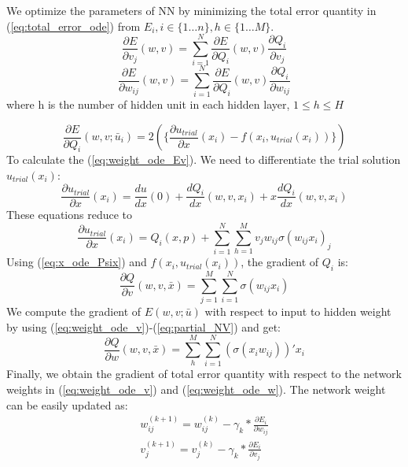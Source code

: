 \documentclass{article}
\begin{document}
\medskip \noindent
We optimize the parameters of NN by minimizing the total error quantity in (\ref{eq:total_error_ode}) from $E_i, i \in \{1 \dots n\}, h \in \{1 \dots M\}$.
\begin{equation}\label{eq:weight_ode_v}
\frac{\partial E}{\partial v_{j}}(w,v) = \sum_{i=1}^{N} \frac{\partial E}{\partial Q_{i}}(w,v)  \frac{\partial Q_{i}}{\partial v_{j}}
\end{equation}
\begin{equation}\label{eq:weight_ode_w}
\frac{\partial E}{\partial w_{ij}}(w,v) = \sum_{i=1}^{N} \frac{\partial E}{\partial Q_{i}}(w,v) \frac{\partial Q_{i}}{\partial w_{ij}}
\end{equation}
where h is the number of hidden unit in each hidden layer, $1 \leq h \leq H$

\begin{equation}\label{eq:weight_ode_Ev}
\frac{\partial E}{\partial Q_{i}}(w,v;\bar{u}_i) = 2\left(\{\frac{\partial u_{trial}}{\partial x}(x_i)-f(x_{i}, u_{trial}(x_i))\}\right)
\end{equation}
\medskip \noindent
To calculate the (\ref{eq:weight_ode_Ev}). We need to differentiate the trial solution $u_{trial}(x_i)$:
\begin{equation}\label{eq: ode_trial_x}
\frac{\partial u_{trial} }{\partial x}(x_i) = \frac{d u}{dx}(0) + \frac{d Q_{i}}{dx}(w,v,x_i) + x\frac{d Q_{i}}{dx}(w,v,x_i)
\end{equation}
These equations reduce to
\begin{equation}\label{eq:x_ode_Psix}
\frac{\partial u_{trial} }{\partial x}(x_i) = Q_{i}(x,p) + \sum_{i=1}^{N}\sum_{h=1}^{M} \textit{v}_{j} w_{ij} \sigma (w_{ij}x_{i})_{j}
\end{equation}
Using (\ref{eq:x_ode_Psix}) and $f(x_{i}, u_{trial}(x_i))$, the gradient of $Q_{i}$ is:
\begin{equation}\label{eq:partial_NV}
\frac{\partial Q}{\partial v} (w,v,\bar{x})= \sum_{j=1}^{M} \sum_{i=1}^{N}\sigma (w_{ij}x_{i})
\end{equation}
\medspace \noindent
We compute the gradient of $E(w,v;\bar{u})$ with respect to input to hidden weight by using (\ref{eq:weight_ode_v})-(\ref{eq:partial_NV}) and get:
\begin{equation} \label{eq:weight_ode_ow}
\frac{\partial Q}{\partial w} (w,v,\bar{x})= \sum_{h}^{M} \sum_{i=1}^{N} (\sigma(x_{i}w_{ij}))'x_i
\end{equation}
\medskip \noindent
Finally, we obtain the gradient of total error quantity with respect to the network weights in (\ref{eq:weight_ode_v}) and (\ref{eq:weight_ode_w}). The network weight can be easily updated as:
\begin{equation}
\begin{aligned}
w_{ij}^{(k+1)} = w_{ij}^{(k)} - \gamma_{k}*\frac{\partial E_i}{\partial w_{ij}} \\
v_{j}^{(k+1)} = v_{j}^{(k)} - \gamma_{k}*\frac{\partial E_i}{\partial v_{j}}
\end{aligned}
\end{equation}
\end{document}

